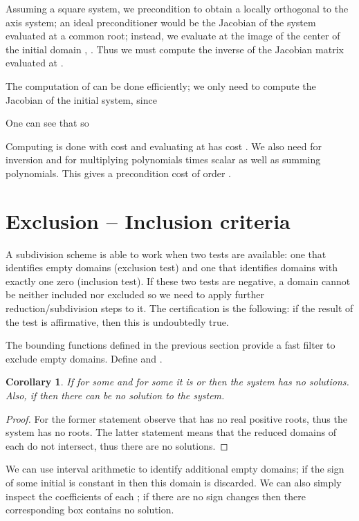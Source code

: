 \documentclass{sig-alternate}
\newtheorem{corollary}[theorem]{Corollary}
\begin{document}
Assuming a square system, we precondition  to
obtain a locally orthogonal to the axis system; an ideal
preconditioner would be the Jacobian of the system evaluated at a
common root; instead, we evaluate  at the image of the
center  of the initial domain ,
. Thus we must compute the inverse of the Jacobian matrix
 evaluated
at .

The computation of  can be done
efficiently; we only need to compute the Jacobian of the initial
system, since

One can see that  so

\fi

 Computing  is done with cost 
and evaluating at  has cost . We also need
 for inversion and  for multiplying
polynomials times scalar as well as summing polynomials. This
gives a precondition cost of order .


\section{Exclusion -- Inclusion criteria} \label{criteria}

A subdivision scheme is able to work when two tests are
available: one that identifies empty domains (exclusion test) and one
that identifies domains with exactly one zero (inclusion test). If
these two tests are negative, a domain cannot be neither included nor
excluded so we need to apply further reduction/subdivision steps to it.
The certification is the following: if the result of the test is affirmative,
then this is undoubtedly true.

The bounding functions defined in the previous section provide a fast
filter to exclude empty domains. 
Define  and .

\begin{corollary}
If for some  and for some  it is
 or  then the system has no
solutions.  Also, if  
  then there can be no
solution to the system.
\end{corollary}
\begin{proof}
  For the former statement observe that  has no real positive
  roots, thus the system has no roots. The latter statement means that
  the reduced domains of each  do not intersect, thus
  there are no solutions.
\end{proof}

We can use interval arithmetic to identify additional empty domains; if
the sign of some initial  is constant in  then this domain is discarded. We can also simply inspect the
coefficients of each ; if there are no sign changes then there
corresponding box contains no solution.
\end{document}
